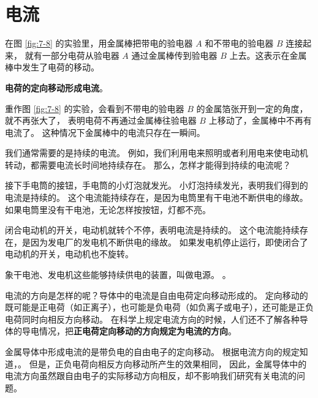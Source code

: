 \section{电流}\label{sec:7-4}

在图 \ref{fig:7-8} 的实验里，用金属棒把带电的验电器 $A$ 和不带电的验电器 $B$ 连接起来，
就有一部分电荷从验电器 $A$ 通过金属棒传到验电器 $B$ 上去。这表示在金属棒中发生了电荷的移动。

\textbf{电荷的定向移动形成电流}。

重作图 \ref{fig:7-8} 的实验，会看到不带电的验电器 $B$ 的金属箔张开到一定的角度，就不再张大了，
表明电荷不再通过金属棒往验电器 $B$ 上移动了，金属棒中不再有电流了。
这种情况下金属棒中的电流只存在一瞬间。

我们通常需要的是持续的电流。
例如，我们利用电来照明或者利用电来使电动机转动，都需要电流长时间地持续存在。
那么，怎样才能得到持续的电流呢？

接下手电筒的接钮，手电筒的小灯泡就发光。
小灯泡持续发光，表明我们得到的电流是持续的。
这个电流能持续存在，是因为电筒里有干电池不断供电的缘故。
如果电筒里没有干电池，无论怎样按按钮，灯都不亮。

闭合电动机的开关，电动机就转个不停，表明电流是持续的。
这个电流能持续存在，是因为发电厂的发电机不断供电的缘故。
如果发电机停止运行，即使闭合了电动机的开关，电动机也不旋转。

象干电池、发电机这些能够持续供电的装置，叫做电源。
。

电流的方向是怎样的呢？导体中的电流是自由电荷定向移动形成的。
定向移动的既可能是正电荷（如正离子），也可能是负电荷（如负离子或电子），还可能是正负电荷同时向相反方向移动。
在科学上规定电流方向的时候，人们还不了解各种导体的导电情况，把\textbf{正电荷定向移动的方向规定为电流的方向}。

金属导体中形成电流的是带负电的自由电子的定向移动。
根据电流方向的规定知道，。
但是，正负电荷向相反方向移动所产生的效果相同，
因此，金属导体中的电流方向虽然跟自由电子的实际移动方向相反，却不影响我们研究有关电流的问题。

